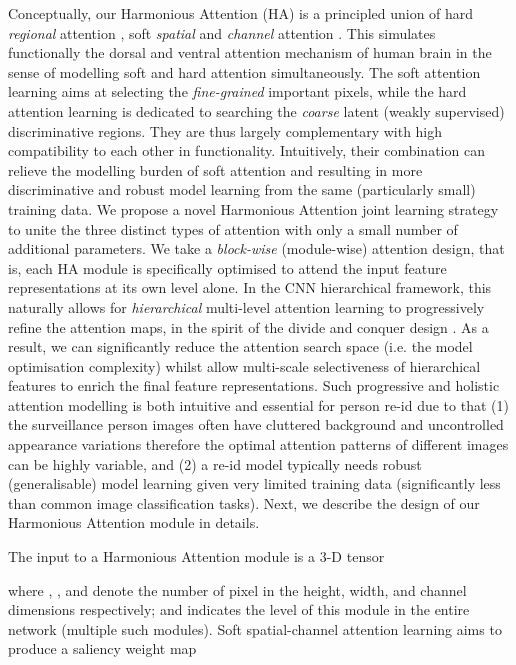 \documentclass[10pt,twocolumn,letterpaper]{article}
\begin{document}
Conceptually, our Harmonious Attention (HA) is a principled union
of {hard} {\em regional} attention \cite{jaderberg2015spatial},
soft {\em spatial} \cite{wang2017residual} and
{\em channel} attention \cite{hu2017squeeze}.
This simulates functionally the dorsal and ventral attention mechanism of human brain \cite{vossel2014dorsal} in the sense of modelling soft and hard attention simultaneously. 
The soft attention learning aims at selecting 
the {\em fine-grained} important pixels,
while the hard attention learning is dedicated 
to searching the {\em coarse} latent ({weakly supervised}) discriminative regions.
They are thus largely complementary
with high compatibility to each other in functionality.
Intuitively, their combination can relieve the modelling burden of soft attention
and resulting in more discriminative and robust model learning
from the same (particularly small) training data. 
We propose a novel {Harmonious Attention joint learning} strategy to unite 
the three distinct types of attention with only a small number of additional parameters.
We take a {\em block-wise} (module-wise) attention design,
that is, each HA module is specifically optimised to attend
the input feature representations at its own level alone.
In the CNN hierarchical framework, this naturally allows for 
{\em hierarchical} multi-level attention learning to progressively refine the attention maps, 
in the spirit of the divide and conquer design \cite{cormen2009introduction}.
As a result, we can significantly reduce the attention search space
(i.e. the model optimisation complexity) whilst allow
multi-scale selectiveness of hierarchical features to enrich the final feature representations.
Such progressive and holistic attention modelling is both intuitive and essential for person re-id 
due to that (1) the surveillance person images often have cluttered background and uncontrolled appearance variations therefore
the optimal attention patterns of different images can be highly variable,
and (2) a re-id model typically needs robust (generalisable) model learning given very
limited training data (significantly less than common image
classification tasks).
Next, we describe the design of our Harmonious Attention module in details.

\vspace{0.01cm}
The input to a Harmonious Attention module is a 3-D tensor

where , , and  denote the number of pixel in
the height, width, and channel dimensions respectively;
and  indicates the level of this module in the entire network
(multiple such modules).
Soft spatial-channel attention learning aims to produce a saliency weight map 
\end{document}

